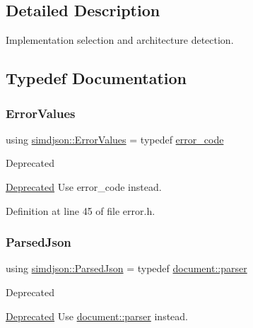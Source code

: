 \subsection{Detailed Description}
Implementation selection and architecture detection. 

\subsection{Typedef Documentation}
\mbox{\label{namespacesimdjson_a63b494af834917af13120dcd57719bdb}} 
\subsubsection{\texorpdfstring{Error\+Values}{ErrorValues}}
{\footnotesize\ttfamily using \hyperlink{namespacesimdjson_a7b735a3a50ba79e3f7f14df5f77d8da9}{simdjson\+::\+Error\+Values} = typedef \hyperlink{namespacesimdjson_a7b735a3a50ba79e3f7f14df5f77d8da9}{error\+\_\+code}}

\begin{DoxyRefDesc}{Deprecated}
\item[\hyperlink{deprecated__deprecated000010}{Deprecated}]Use {\ttfamily error\+\_\+code} instead.\end{DoxyRefDesc}


Definition at line 45 of file error.\+h.

\mbox{\label{namespacesimdjson_af6e1badb302f3bbaa7eb7465b556de3c}} 
\subsubsection{\texorpdfstring{Parsed\+Json}{ParsedJson}}
{\footnotesize\ttfamily using \hyperlink{namespacesimdjson_af6e1badb302f3bbaa7eb7465b556de3c}{simdjson\+::\+Parsed\+Json} = typedef \hyperlink{classsimdjson_1_1document_1_1parser}{document\+::parser}}

\begin{DoxyRefDesc}{Deprecated}
\item[\hyperlink{deprecated__deprecated000020}{Deprecated}]Use {\ttfamily \hyperlink{classsimdjson_1_1document_1_1parser}{document\+::parser}} instead.\end{DoxyRefDesc}


